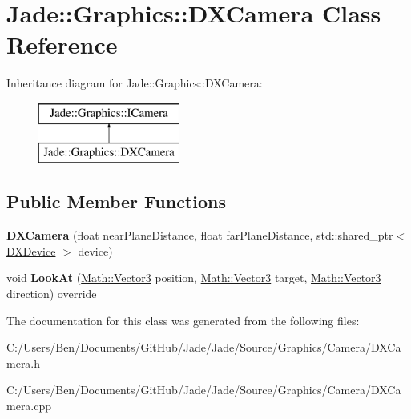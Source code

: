\hypertarget{class_jade_1_1_graphics_1_1_d_x_camera}{}\section{Jade\+:\+:Graphics\+:\+:D\+X\+Camera Class Reference}
\label{class_jade_1_1_graphics_1_1_d_x_camera}
Inheritance diagram for Jade\+:\+:Graphics\+:\+:D\+X\+Camera\+:\begin{figure}[H]
\begin{center}
\leavevmode
\includegraphics[height=2.000000cm]{class_jade_1_1_graphics_1_1_d_x_camera}
\end{center}
\end{figure}
\subsection*{Public Member Functions}
\begin{DoxyCompactItemize}
\item 
\hypertarget{class_jade_1_1_graphics_1_1_d_x_camera_ae619422265d0015345fee4ba6b2ba269}{}{\bfseries D\+X\+Camera} (float near\+Plane\+Distance, float far\+Plane\+Distance, std\+::shared\+\_\+ptr$<$ \hyperlink{class_jade_1_1_graphics_1_1_d_x_device}{D\+X\+Device} $>$ device)\label{class_jade_1_1_graphics_1_1_d_x_camera_ae619422265d0015345fee4ba6b2ba269}

\item 
\hypertarget{class_jade_1_1_graphics_1_1_d_x_camera_a78531143fdc6d1b73b049c6ff18e3f3b}{}void {\bfseries Look\+At} (\hyperlink{struct_jade_1_1_math_1_1_vector3}{Math\+::\+Vector3} position, \hyperlink{struct_jade_1_1_math_1_1_vector3}{Math\+::\+Vector3} target, \hyperlink{struct_jade_1_1_math_1_1_vector3}{Math\+::\+Vector3} direction) override\label{class_jade_1_1_graphics_1_1_d_x_camera_a78531143fdc6d1b73b049c6ff18e3f3b}

\end{DoxyCompactItemize}


The documentation for this class was generated from the following files\+:\begin{DoxyCompactItemize}
\item 
C\+:/\+Users/\+Ben/\+Documents/\+Git\+Hub/\+Jade/\+Jade/\+Source/\+Graphics/\+Camera/D\+X\+Camera.\+h\item 
C\+:/\+Users/\+Ben/\+Documents/\+Git\+Hub/\+Jade/\+Jade/\+Source/\+Graphics/\+Camera/D\+X\+Camera.\+cpp\end{DoxyCompactItemize}
